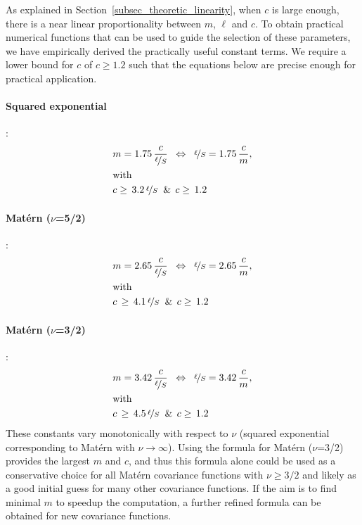 As explained in Section~\ref{subsec_theoretic_linearity}, when $c$ is large enough, there is a near linear proportionality between $m$, $\ell$ and $c$. To obtain practical numerical functions that can be used to guide the selection of these parameters, we have empirically derived the practically useful constant terms. We require a lower bound for $c$ of $c \geq 1.2$ such that the equations below are precise enough for practical application.


\paragraph*{Squared exponential}:
%
\begin{align}
&m= 1.75 \, \frac{c}{\nicefrac{\ell}{S}} \;\; \Leftrightarrow \;\; \nicefrac{\ell}{S}= 1.75 \, \frac{c}{m},	\label{eq_m_l_QE} \\
&\text{with} \nonumber \\
&c \geq \, 3.2 \, \nicefrac{\ell}{S} \;\; \& \;\, c \geq \, 1.2	\label{eq_c_vs_l_QE}
\end{align}

\paragraph*{Mat\'ern ($\nu$=5/2)}:
%
\begin{align}
&m= 2.65 \, \frac{c}{\nicefrac{\ell}{S}} \;\; \Leftrightarrow \;\; \nicefrac{\ell}{S}= 2.65 \, \frac{c}{m}, \label{eq_m_l_mat52} \\
&\text{with} \nonumber \\
&c \, \geq \, 4.1 \, \nicefrac{\ell}{S} \;\; \& \;\, c \geq \, 1.2  \label{eq_c_vs_l_mat52}
\end{align}

\paragraph*{Mat\'ern ($\nu$=3/2)}:
%
\begin{align}
&m= 3.42 \, \frac{c}{\nicefrac{\ell}{S}} \;\; \Leftrightarrow \;\; \nicefrac{\ell}{S}= 3.42 \, \frac{c}{m}, \label{eq_m_l_mat32}\\
&\text{with} \nonumber \\
&c \, \geq \, 4.5 \, \nicefrac{\ell}{S} \;\; \& \;\, c \geq \, 1.2 \label{eq_c_vs_l_mat32}
\end{align}
%
These constants vary monotonically with respect to $\nu$ (squared exponential corresponding to Mat\'ern with $\nu \to \infty$). Using the formula for Mat\'ern ($\nu$=3/2) provides the largest $m$ and $c$, and thus this formula alone could be used as a conservative choice for all Mat\'ern covariance functions with $\nu \geq 3/2$ and likely as a good initial guess for many other covariance functions. If the aim is to find minimal $m$ to speedup the computation, a further refined formula can be obtained for new covariance functions.

